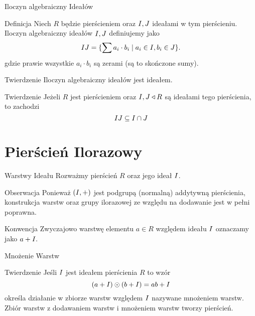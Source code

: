 \documentclass{beamer}
\newcommand{\II}{\mathnormal{I}}
\newcommand{\JJ}{\mathnormal{J}}
\begin{document}
\begin{frame}{Iloczyn algebraiczny Ideałów}
    \begin{block}{Definicja}
        Niech $R$ będzie pierścieniem oraz $\II, \JJ$ ideałami w tym pierścieniu. \alert{Iloczyn algebraiczny ideałów $\II, \JJ$} definiujemy jako
        $$ \II \JJ = \{ \sum a_i \cdot b_i \mid a _i\in \II, b_i \in \JJ\}.$$
        gdzie prawie wszystkie $a_i \cdot b_i$ są zerami (są to skończone sumy).
    \end{block}
    \pause
    \begin{block}{Twierdzenie}
        Iloczyn algebraiczny ideałów jest ideałem. 
    \end{block}
    \pause
    \begin{block}{Twierdzenie}
        Jeżeli $R$ jest pierścieniem oraz $\II, \JJ \triangleleft R$ są ideałami tego pierścienia, to zachodzi
        $$\II \JJ \subseteq \II \cap \JJ $$
    \end{block}
\end{frame}

\section{Pierścień Ilorazowy}
\begin{frame}{Warstwy Ideału}
    Rozważmy pierścień $R$ oraz jego ideał $\II$.
    \begin{alertblock}{Obserwacja}
        Ponieważ $(\II, +)$ jest podgrupą (normalną) addytywną pierścienia, konstrukcja warstw oraz grupy ilorazowej ze względu na dodawanie jest w pełni poprawna.
    \end{alertblock}
    \begin{alertblock}{Konwencja}
        Zwyczajowo warstwę elementu $a \in R$ względem ideału $\II$ oznaczamy jako $a + \II.$ 
    \end{alertblock}
\end{frame}

\begin{frame}{Mnożenie Warstw}
    \begin{block}{Twierdzenie}
        Jeśli $\II$ jest ideałem pierścienia $R$ to wzór
        $$(a + \II) \odot (b + \II) = ab + \II$$
        określa działanie w zbiorze warstw względem $\II$ nazywane mnożeniem warstw. Zbiór warstw z dodawaniem warstw i mnożeniem warstw tworzy pierścień.
    \end{block}
\end{frame}
\end{document}
